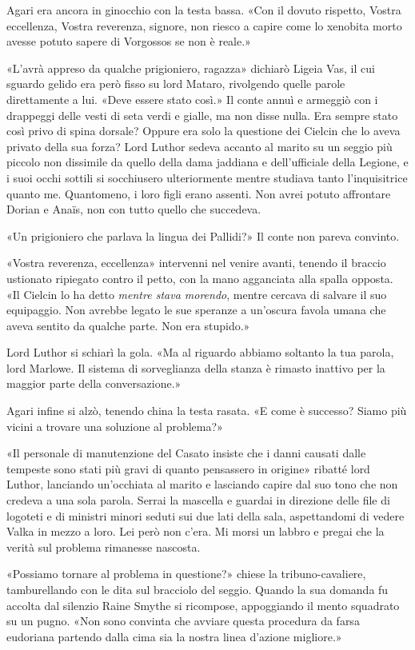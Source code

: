 Agari era ancora in ginocchio con la testa bassa. «Con il dovuto
rispetto, Vostra eccellenza, Vostra reverenza, signore, non riesco a
capire come lo xenobita morto avesse potuto sapere di Vorgossos se non è
reale.»

«L'avrà appreso da qualche prigioniero, ragazza» dichiarò Ligeia Vas, il
cui sguardo gelido era però fisso su lord Mataro, rivolgendo quelle
parole direttamente a lui. «Deve essere stato così.» Il conte annuì e
armeggiò con i drappeggi delle vesti di seta verdi e gialle, ma non
disse nulla. Era sempre stato così privo di spina dorsale? Oppure era
solo la questione dei Cielcin che lo aveva privato della sua forza? Lord
Luthor sedeva accanto al marito su un seggio più piccolo non dissimile
da quello della dama jaddiana e dell'ufficiale della Legione, e i suoi
occhi sottili si socchiusero ulteriormente mentre studiava tanto
l'inquisitrice quanto me. Quantomeno, i loro figli erano assenti. Non
avrei potuto affrontare Dorian e Anaïs, non con tutto quello che
succedeva.

«Un prigioniero che parlava la lingua dei Pallidi?» Il conte non pareva
convinto.

«Vostra reverenza, eccellenza» intervenni nel venire avanti, tenendo il
braccio ustionato ripiegato contro il petto, con la mano agganciata alla
spalla opposta. «Il Cielcin lo ha detto \emph{mentre stava morendo},
mentre cercava di salvare il suo equipaggio. Non avrebbe legato le sue
speranze a un'oscura favola umana che aveva sentito da qualche parte.
Non era stupido.»

Lord Luthor si schiarì la gola. «Ma al riguardo abbiamo soltanto la tua
parola, lord Marlowe. Il sistema di sorveglianza della stanza è rimasto
inattivo per la maggior parte della conversazione.»

Agari infine si alzò, tenendo china la testa rasata. «E come è successo?
Siamo più vicini a trovare una soluzione al problema?»

«Il personale di manutenzione del Casato insiste che i danni causati
dalle tempeste sono stati più gravi di quanto pensassero in origine»
ribatté lord Luthor, lanciando un'occhiata al marito e lasciando capire
dal suo tono che non credeva a una sola parola. Serrai la mascella e
guardai in direzione delle file di logoteti e di ministri minori seduti
sui due lati della sala, aspettandomi di vedere Valka in mezzo a loro.
Lei però non c'era. Mi morsi un labbro e pregai che la verità sul
problema rimanesse nascosta.

«Possiamo tornare al problema in questione?» chiese la
tribuno-cavaliere, tamburellando con le dita sul bracciolo del seggio.
Quando la sua domanda fu accolta dal silenzio Raine Smythe si ricompose,
appoggiando il mento squadrato su un pugno. «Non sono convinta che
avviare questa procedura da farsa eudoriana partendo dalla cima sia la
nostra linea d'azione migliore.»

